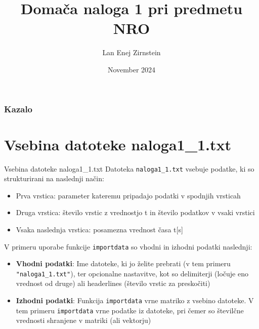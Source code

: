 \documentclass{beamer}
\title{Domača naloga 1 pri predmetu NRO}
\author{Lan Enej Zirnstein}
\date{November 2024}
\begin{document}
\maketitle

\begin{frame}
    \frametitle{Kazalo}
    \tableofcontents[sectionstyle=show, subsectionstyle=show/shaded/hide]
\end{frame}

\section{Vsebina datoteke naloga1\_1.txt}
\begin{frame}{Vsebina datoteke naloga1\_1.txt}
    Datoteka \texttt{naloga1\_1.txt} vsebuje podatke, ki so strukturirani na naslednji način:
    \begin{itemize}
        \item Prva vrstica: parameter kateremu pripadajo podatki v spodnjih vrsticah
        \item Druga vrstica: število vrstic z vrednostjo t in število podatkov v vsaki vrstici
        \item Vsaka naslednja vrstica: posamezna vrednost časa t[s]
    \end{itemize}

    V primeru uporabe funkcije \texttt{importdata} so vhodni in izhodni podatki naslednji:
    \begin{itemize}
        \item \textbf{Vhodni podatki}: Ime datoteke, ki jo želite prebrati (v tem primeru \texttt{"naloga1\_1.txt"}), ter opcionalne nastavitve, kot so delimiterji (ločuje eno vrednost od druge) ali headerlines (število vrstic za preskočiti)
        \item \textbf{Izhodni podatki}: Funkcija \texttt{importdata} vrne matriko z vsebino datoteke. V tem primeru \texttt{importdata} vrne podatke iz datoteke, pri čemer so številčne vrednosti shranjene v matriki (ali vektorju)
    \end{itemize}
\end{frame}
\end{document}
